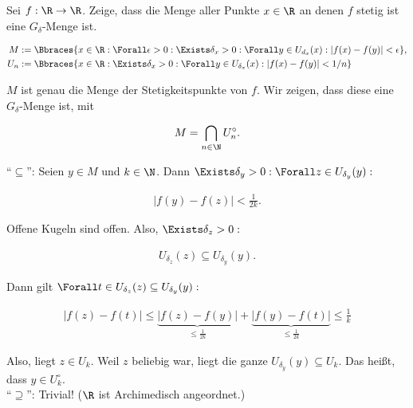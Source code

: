 \begin{exercise}

Sei $f: \R \rightarrow \R$. Zeige, dass die Menge aller Punkte $x \in \R$ an denen $f$ stetig ist eine $G_{\delta}$-Menge ist.

\end{exercise}

\begin{solution}

\begin{align*}
  M & := \Bbraces
  {
    x \in \R:
    \Forall \epsilon > 0:
    \Exists \delta_x > 0:
    \Forall y \in U_{d_x}(x):
    |f(x) - f(y)| < \epsilon
  }, \\
  U_n & := \Bbraces
  {
    x \in \R:
    \Exists \delta_x > 0:
    \Forall y \in U_{\delta_x}(x):
    |f(x) - f(y)| < 1/n
  }
\end{align*}

$M$ ist genau die Menge der Stetigkeitspunkte von $f$.
Wir zeigen, dass diese eine $G_\delta$-Menge ist, mit

\begin{align*}
  M = \bigcap_{n \in \N} U_n^\circ.
\end{align*}

\enquote{$\subseteq$}:
Seien $y \in M$ und $k \in \N$.
Dann $\Exists \delta_y > 0: \Forall z \in U_{\delta_y}(y):$

\begin{align*}
    |f(y) - f(z)| < \frac{1}{2k}.
\end{align*}

Offene Kugeln sind offen.
Also, $\Exists \delta_z > 0:$

\begin{align*}
  U_{\delta_z}(z)
  \subseteq
  U_{\delta_y}(y).
\end{align*}

Dann gilt $\Forall t \in U_{\delta_z}(z) \subseteq U_{\delta_y}(y):$

\begin{align*}
    |f(z) - f(t)|
    \leq
    \underbrace{|f(z) - f(y)|}_{\leq \frac{1}{2 k}} +
    \underbrace{|f(y) - f(t)|}_{\leq \frac{1}{2 k}}
    \leq
    \frac{1}{k}
\end{align*}

Also, liegt $z \in U_k$.
Weil $z$ beliebig war, liegt die ganze $U_{\delta_y}(y) \subseteq U_k$.
Das heißt, dass $y \in U_k^\circ.$ \\

\enquote{$\supseteq$}:
Trivial!
($\R$ ist Archimedisch angeordnet.)

\end{solution}
